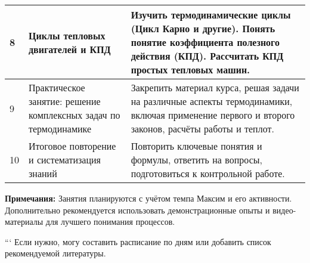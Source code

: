 \begin{tabular}{|p{3cm}|p{7cm}|p{5cm}|}
\hline
8 & Циклы тепловых двигателей и КПД & Изучить термодинамические циклы (Цикл Карно и другие). Понять понятие коэффициента полезного действия (КПД). Рассчитать КПД простых тепловых машин. \\
\hline
9 & Практическое занятие: решение комплексных задач по термодинамике & Закрепить материал курса, решая задачи на различные аспекты термодинамики, включая применение первого и второго законов, расчёты работы и теплот. \\
\hline
10 & Итоговое повторение и систематизация знаний & Повторить ключевые понятия и формулы, ответить на вопросы, подготовиться к контрольной работе. \\
\hline
\end{tabular}

\vspace{0.5cm}

\textbf{Примечания:} Занятия планируются с учётом темпа Максим и его активности. Дополнительно рекомендуется использовать демонстрационные опыты и видео-материалы для лучшего понимания процессов.

```
Если нужно, могу составить расписание по дням или добавить список рекомендуемой литературы.